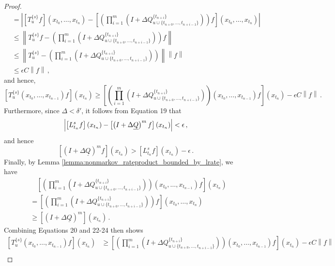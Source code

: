 \documentclass[a4paper,reqno]{amsart}
\newcommand{\lrate}{\underline{Q}}
\newcommand{\norm}[1]{\left\lVert #1 \right\rVert}
\begin{document}
\begin{proof}
\begin{align*}
&= \left\vert \left[T_{u}^{\{s\}}f\right](x_{t_0},\ldots,x_{t_{n}}) - \left[\left(\prod_{i=1}^m\left(I + \Delta Q_{u\cup\{t_{n+0},\ldots,t_{n+i-1}\}}^{\{t_{n+i}\}}\right)\right)f\right](x_{t_0},\ldots,x_{t_{n}})\right\vert \\
&\leq \norm{T_{u}^{\{s\}}f - \left(\prod_{i=1}^m\left(I + \Delta Q_{u\cup\{t_{n+0},\ldots,t_{n+i-1}\}}^{\{t_{n+i}\}}\right)\right)f} \\
&\leq \norm{T_{u}^{\{s\}} - \left(\prod_{i=1}^m\left(I + \Delta Q_{u\cup\{t_{n+0},\ldots,t_{n+i-1}\}}^{\{t_{n+i}\}}\right)\right)}\norm{f} \\
&\leq \epsilon C\norm{f}\,,
\end{align*}
and hence,
\begin{equation}
\left[T_u^{\{s\}}(x_{t_0},\ldots,x_{t_{n-1}})f\right](x_{t_n}) \geq \left[\left(\prod_{i=1}^m\left(I + \Delta Q_{u\cup\{t_{n+0},\ldots,t_{n+i-1}\}}^{\{t_{n+i}\}}\right)\right)(x_{t_0},\ldots,x_{t_{n-1}})f\right](x_{t_n}) - \epsilon C\norm{f}\,.
\end{equation}
Furthermore, since $\Delta<\delta'$, it follows from Equation 19 that
\begin{equation*}
\Bigl\vert \left[L_{t_n}^sf\right](x_{t_n}) - \left[\left(I + \Delta\lrate\right)^mf\right](x_{t_n})\Bigr\vert < \epsilon\,,
\end{equation*}
and hence
\begin{equation}
\left[\left(I+\Delta\lrate\right)^mf\right](x_{t_n}) > \left[L_{t_n}^sf\right](x_{t_n}) - \epsilon\,.
\end{equation}
Finally, by Lemma \ref{lemma:nonmarkov_rateproduct_bounded_by_lrate}, we have
\begin{align}
&\quad \left[\left(\prod_{i=1}^m\left(I + \Delta Q_{u\cup\{t_{n+0},\ldots,t_{n+i-1}\}}^{\{t_{n+i}\}}\right) \right)(x_{t_0},\ldots,x_{t_{n-1}})f\right](x_{t_n}) \\
&= \left[\left(\prod_{i=1}^m\left(I + \Delta Q_{u\cup\{t_{n+0},\ldots,t_{n+i-1}\}}^{\{t_{n+i}\}}\right) \right)f\right](x_{t_0},\ldots,x_{t_n}) \\
&\geq \left[\left(I+\Delta\lrate\right)^m\right](x_{t_n})\,.
\end{align}
Combining Equations 20 and 22-24 then shows
\begin{align*}
\left[T_u^{\{s\}}(x_{t_0},\ldots,x_{t_{n-1}})f\right](x_{t_n}) &\geq \left[\left(\prod_{i=1}^m\left(I + \Delta Q_{u\cup\{t_{n+0},\ldots,t_{n+i-1}\}}^{\{t_{n+i}\}}\right)\right)(x_{t_0},\ldots,x_{t_{n-1}})f\right](x_{t_n}) - \epsilon C\norm{f} \\

\end{align*}
\end{proof}
\end{document}
